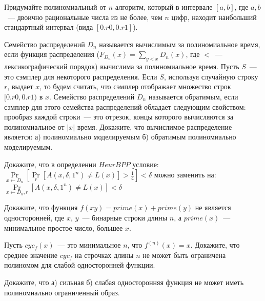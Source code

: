 \setcounter{curtask}{9}



\begin{task}
    Придумайте полиномиальный от $n$ алгоритм, который в интервале $[a, b]$, где $a,
    b$~--- двоично рациональные числа из не более, чем $n$ цифр, находит наибольший
    стандартный интервал (вида $[0.r0, 0.r1]$).
\end{task}

\begin{task}
    Семейство распределений $D_n$ называется вычислимым за полиномиальное время, если
    функция распределения ($F_{D_n}(x) = \sum\limits_{y < x}D_n(x)$, где $<$~---
    лексикографический порядок) вычислима за полиномиальное время. Пусть $S$~--- это
    сэмплер для некоторого распределения. Если $S$, используя случайную строку $r$,
    выдает $x$, то будем считать, что сэмплер отображает множество строк $[0.r0,
    0.r1)$ в $x$. Семейство распределений $D_n$ называется обратимым, если сэмплер
    для этого семейства распределений обладает следующим свойством: прообраз каждой
    строки~--- это отрезок, концы которого вычисляются за полиномиальное от $|x|$
    время. Докажите, что вычислимое распределение является: а) полиномиально
    моделируемым б) обратимым полиномиально моделируемым.
\end{task}

\begin{task}
    Докажите, что в определении $HeurBPP$ условие:
    $\Pr\limits_{x \gets D_n}[\Pr\limits_{r}[A(x, \delta, 1^n) \neq L(x)] >
    \frac{1}{4}] < \delta$ можно заменить на:
    $\Pr\limits_{x \gets D_n, r}[A(x, \delta, 1^n) \neq L(x)] <
    \delta$
\end{task}

\begin{task}
    Докажите, что функция $f(xy) = prime(x) + prime(y)$ не является односторонней,
    где $x$, $y$~--- бинарные строки длины $n$, а $prime(x)$~--- минимальное простое
    число, большее $x$.
\end{task}

\begin{task}
    Пусть $cyc_{f}(x)$~--- это минимальное $n$, что $f^{(n)}(x) = x$. Докажите, что
    среднее значение $cyc_{f}$ на строчках длины $n$ не может быть ограничена
    полиномом для слабой односторонней функции.
\end{task}

\breakline

\begin{ptask}{3}
    Докажите, что а) сильная б) слабая односторонняя функция не может иметь
    полиномиально ограниченный образ.
\end{ptask}
